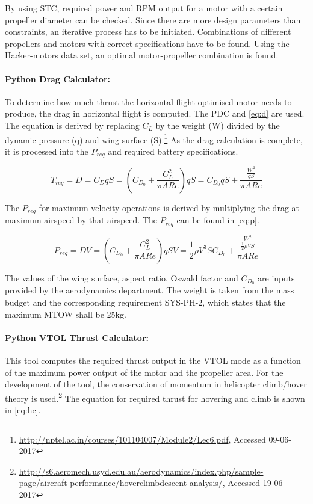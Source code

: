 By using STC, required power and RPM output for a motor with a certain propeller diameter can be checked. Since there are more design parameters than constraints, an iterative process has to be initiated. Combinations of different propellers and motors with correct specifications have to be found. Using the Hacker-motors data set\cite{hackerdata}, an optimal motor-propeller combination is found.

\paragraph{Python Drag Calculator:}
To determine how much thrust the horizontal-flight optimised motor needs to produce, the drag in horizontal flight is computed. The PDC and \autoref{eq:d} are used. The equation is derived by replacing $C_{L}$ by the weight (W) divided by the dynamic pressure (q) and wing surface (S).\footnote{\url{http://nptel.ac.in/courses/101104007/Module2/Lec6.pdf}, Accessed 09-06-2017} As the drag calculation is complete, it is processed into the $P_{req}$ and required battery specifications.


\begin{equation}
\label{eq:d}
    T_{req} = D = C_{D} q S = (C_{D_{0}} + \frac{C_{L}^{2}}{\pi AR e}) q S = C_{D_{0}}q S  + \frac{\frac{W^{2}}{q S}}{\pi AR e}
\end{equation}

The $P_{req}$ for maximum velocity operations is derived by multiplying the drag at maximum airspeed by that airspeed. The  $P_{req}$ can be found in \autoref{eq:p}.

\begin{equation}
\label{eq:p}
    P_{req} = D V = (C_{D_{0}} + \frac{C_{L}^{2}}{\pi AR e}) q S V =  \frac{1}{2} \rho V^{3} S C_{D_{0}} + \frac{\frac{W^{2}}{\frac{1}{2} \rho V S}}{\pi AR e}
\end{equation}

The values of the wing surface, aspect ratio, Oswald factor and $C_{D_{0}}$ are inputs provided by the aerodynamics department. The weight is taken from the mass budget and the corresponding requirement SYS-PH-2, which states that the maximum MTOW shall be 25kg.

\paragraph{Python VTOL Thrust Calculator:}
This tool computes the required thrust output in the VTOL mode as a function of the maximum power output of the motor and the propeller area. For the development of the tool, the conservation of momentum in helicopter climb/hover theory is used.\footnote{\url{http://s6.aeromech.usyd.edu.au/aerodynamics/index.php/sample-page/aircraft-performance/hoverclimbdescent-analysis/}, Accessed 19-06-2017} The equation for required thrust for hovering and climb is shown in \autoref{eq:hc}.

